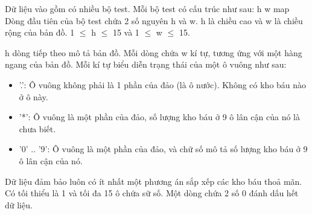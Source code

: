 Dữ liệu vào gồm có nhiều bộ test. Mỗi bộ test có cấu trúc như sau: h w map Dòng đầu tiên của bộ test chứa 2 số nguyên h và w. h là chiều cao và w là chiều rộng của bản đồ. 1 $\le$ h $\le$ 15 và 1 $\le$ w $\le$ 15.

h dòng tiếp theo mô tả bản đồ. Mỗi dòng chứa w kí tự, tương ứng với một hàng ngang của bản đồ. Mỗi kí tự biểu diễn trạng thái của một ô vuông như sau:
\begin{itemize}
	\item '.': Ô vuông không phải là 1 phần của đảo (là ô nước). Không có kho báu nào ở ô này.
	\item '*': Ô vuông là một phần của đảo, số lượng kho báu ở 9 ô lân cận của nó là chưa biết.
	\item '0' .. '9': Ô vuông là một phần của đảo, và chữ số mô tả số lượng kho báu ở 9 ô lân cận của nó.
\end{itemize}

Dữ liệu đảm bảo luôn có ít nhất một phương án sắp xếp các kho báu thoả mãn. Có tối thiểu là 1 và tối đa 15 ô chứa sữ số. Một dòng chứa 2 số 0 đánh dấu hết dữ liệu.

\